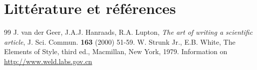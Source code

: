 \section{Littérature et références}

\begin{thebibliography}{99}
J. van der Geer, J.A.J. Hanraads, R.A. Lupton, \textit{The art of writing a scientific article}, J. Sci. Commun. \textbf{163} (2000) 51-59.
W. Strunk Jr., E.B. White, The Elements of Style, third ed., Macmillan, New York, 1979.
Information on \url{http://www.weld.labs.gov.cn}
\end{thebibliography}

